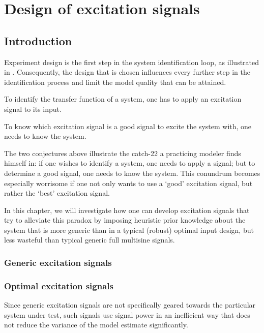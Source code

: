\chapter{Design of excitation signals}
\label{sec:excitation}
\def\thisDir{ch02-qlogms}

\section{Introduction}
\label{sec:excitation:intro}
Experiment design is the first step in the system identification loop, as illustrated in .
Consequently, the design that is chosen influences every further step in the identification process and limit the model quality that can be attained.

\begin{conjecture}
To identify the transfer function of a system, one has to apply an excitation signal to its input.
\end{conjecture}
\begin{conjecture}
To know which excitation signal is a good signal to excite the system with, one needs to know the system.
\end{conjecture}

The two conjectures above illustrate the catch-22 a practicing modeler finds himself in: if one wishes to identify a system, one needs to apply a signal; but to determine a good signal, one needs to know the system.
This conundrum becomes especially worrisome if one not only wants to use a `good' excitation signal, but rather the `best' excitation signal.

In this chapter, we will investigate how one can develop excitation signals that try to alleviate this paradox by imposing heuristic prior knowledge about the system that is more generic than in a typical (robust) optimal input design, but less wasteful than typical generic full multisine signals.

\subsection{Generic excitation signals}
\label{sec:excitation:intro:generic}
\TODO{\ldots}

\subsection{Optimal excitation signals}
\label{sec:excitation:intro:optimal}
Since generic excitation signals are not specifically geared towards the particular system under test, such signals use signal power in an inefficient way that does not reduce the variance of the model estimate significantly.
\TODO{\ldots}

